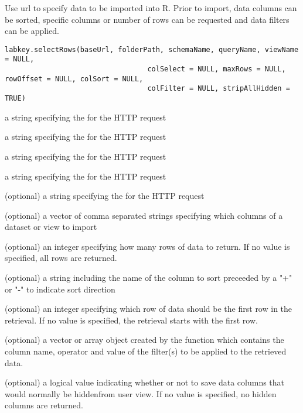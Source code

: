 \documentclass{article}
\begin{document}
\begin{Description}\relax
Use url to specify data to be imported into R. Prior to import, data columns
can be sorted, specific columns or number of rows can be requested and
data filters can be applied.
\end{Description}
\begin{Usage}
\begin{verbatim}
labkey.selectRows(baseUrl, folderPath, schemaName, queryName, viewName = NULL, 
                                  colSelect = NULL, maxRows = NULL, rowOffset = NULL, colSort = NULL, 
                                  colFilter = NULL, stripAllHidden = TRUE)
\end{verbatim}
\end{Usage}
\begin{Arguments}
\begin{ldescription}
\item[\code{baseUrl}] a string specifying the for the HTTP request
\item[\code{folderPath}] a string specifying the  for the HTTP request
\item[\code{schemaName}] a string specifying the   for the HTTP request
\item[\code{queryName}] a string specifying the  for the HTTP request
\item[\code{viewName}] (optional) a string specifying the  for the HTTP request
\item[\code{colSelect}] (optional) a vector of comma separated strings specifying which columns of a dataset or view to import
\item[\code{maxRows}] (optional) an integer specifying how many rows of data to return. If no value is specified, all rows are returned.
\item[\code{colSort}] (optional) a string including the name of the column to sort preceeded by a "+" or "-" to indicate sort direction
\item[\code{rowOffset}] (optional) an integer specifying which row of data should be the first row in the retrieval. If no
value is specified, the retrieval starts with the first row.
\item[\code{colFilter}] (optional) a vector or array object created by the  function which contains the
column name, operator and value of the filter(s) to be applied to the retrieved data.
\item[\code{stripAllHidden}] (optional) a logical value indicating whether or not to save data columns that would normally be hiddenfrom user view. If no value is specified, no hidden columns are returned.
\end{ldescription}
\end{Arguments}
\end{document}
